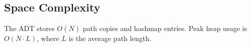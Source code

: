 \subsection{Space Complexity}

The ADT stores $O(N)$ path copies and hashmap entries. Peak heap usage is $O(N \cdot L)$,
where $L$ is the average path length.

%

